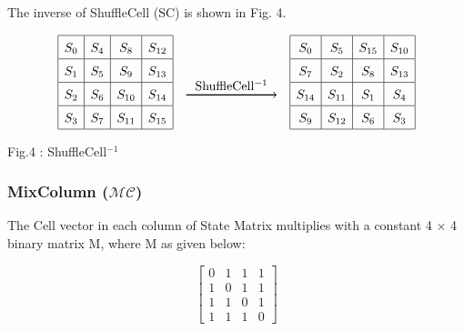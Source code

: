 \documentclass[journal=tosc,preprint]{iacrtrans}
\begin{document}
    The inverse of ShuffleCell (SC) is shown in Fig. 4.

    \[
        \renewcommand{\arraystretch}{1.5} %
        \setlength{\tabcolsep}{0pt} %
        \begin{array}{|c|c|c|c|}
            \hline
            S_{0} & S_{4} & S_{8}  & S_{12} \\ \hline
            S_{1} & S_{5} & S_{9}  & S_{13} \\ \hline
            S_{2} & S_{6} & S_{10} & S_{14} \\ \hline
            S_{3} & S_{7} & S_{11} & S_{15} \\ \hline
        \end{array}
        \quad
        \begin{tikzpicture}[baseline=(current bounding box.center)]
            \draw[->, thick] (0,0) -- (2.5,0) node[midway, above] {ShuffleCell$^{-1}$};
        \end{tikzpicture}
        \quad
        \begin{array}{|c|c|c|c|}
            \hline
            S_{0}  & S_{5}  & S_{15} & S_{10} \\ \hline
            S_{7}  & S_{2}  & S_{8}  & S_{13} \\ \hline
            S_{14} & S_{11} & S_{1}  & S_{4}  \\ \hline
            S_{9}  & S_{12} & S_{6}  & S_{3}  \\ \hline
        \end{array}
    \]
    \begin{center}
        Fig.4 : ShuffleCell$^{-1}$
    \end{center}

    \subsubsection{MixColumn (\( \mathcal{MC} \))}
    The Cell vector in each column of State Matrix multiplies
    with a constant 4 × 4 binary matrix M, where M as given below:

    \begin{equation}
        \begin{bmatrix}
            0 & 1 & 1 & 1 \\
            1 & 0 & 1 & 1 \\
            1 & 1 & 0 & 1 \\
            1 & 1 & 1 & 0
        \end{bmatrix}
        \tag{1}
    \end{equation}
\end{document}
